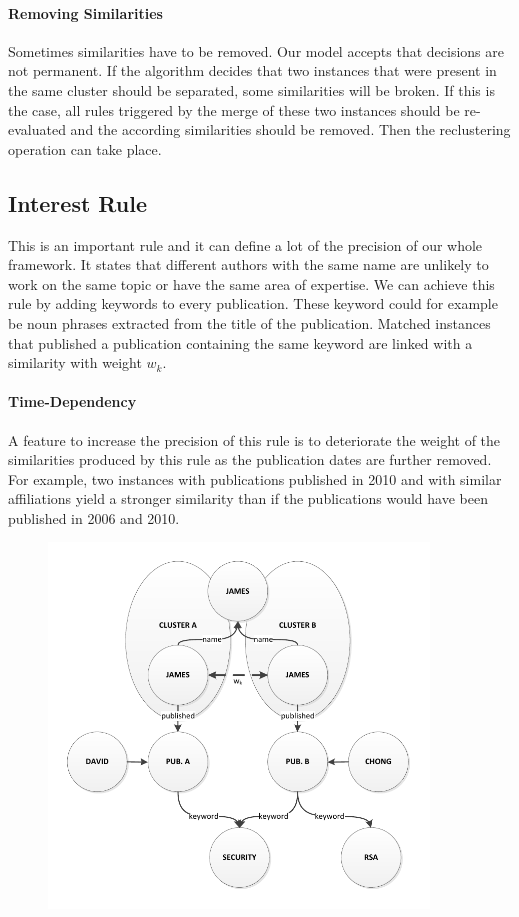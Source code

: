 \paragraph{Removing Similarities} Sometimes similarities have to be removed. Our model accepts that decisions are not permanent. If the algorithm decides that two instances that were present in the same cluster should be separated, some similarities will be broken. If this is the case, all rules triggered by the merge of these two instances should be re-evaluated and the according similarities should be removed. Then the reclustering operation can take place.

\subsection{Interest Rule}

This is an important rule and it can define a lot of the precision of our whole framework. It states that different authors with the same name are unlikely to work on the same topic or have the same area of expertise. We can achieve this rule by adding keywords to every publication. These keyword could for example be noun phrases extracted from the title of the publication. Matched instances that published a publication containing the same keyword are linked with a similarity with weight $w_k$.

\paragraph{Time-Dependency} A feature to increase the precision of this rule is to deteriorate the weight of the similarities produced by this rule as the publication dates are further removed. For example, two instances with publications published in 2010 and with similar affiliations yield a stronger similarity than if the publications would have been published in 2006 and 2010.

\begin{figure}[htb]
	\centering
		\includegraphics[width=0.9\textwidth]{fig/interestrule}
	\caption{}
	\label{fig:interestrule}
\end{figure}

